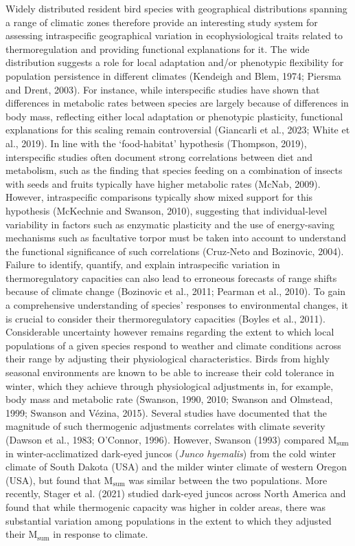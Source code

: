 \documentclass[10pt, twoside]{book} %
\begin{document}
Widely distributed resident bird species with geographical distributions spanning a range of climatic zones therefore provide an interesting study system for assessing intraspecific geographical variation in ecophysiological traits related to thermoregulation and providing functional explanations for it. The wide distribution suggests a role for local adaptation and/or phenotypic flexibility for population persistence in different climates (Kendeigh and Blem, 1974; Piersma and Drent, 2003). For instance, while interspecific studies have shown that differences in metabolic rates between species are largely because of differences in body mass, reflecting either local adaptation or phenotypic plasticity, functional explanations for this scaling remain controversial (Giancarli et al., 2023; White et al., 2019). In line with the ‘food-habitat’ hypothesis (Thompson, 2019), interspecific studies often document strong correlations between diet and metabolism, such as the finding that species feeding on a combination of insects with seeds and fruits typically have higher metabolic rates (McNab, 2009). However, intraspecific comparisons typically show mixed support for this hypothesis (McKechnie and Swanson, 2010), suggesting that individual-level variability in factors such as enzymatic plasticity and the use of energy-saving mechanisms such as facultative torpor must be taken into account to understand the functional significance of such correlations (Cruz‐Neto and Bozinovic, 2004).\\

Failure to identify, quantify, and explain intraspecific variation in thermoregulatory capacities can also lead to erroneous forecasts of range shifts because of climate change (Bozinovic et al., 2011; Pearman et al., 2010). To gain a comprehensive understanding of species' responses to environmental changes, it is crucial to consider their thermoregulatory capacities (Boyles et al., 2011). Considerable uncertainty however remains regarding the extent to which local populations of a given species respond to weather and climate conditions across their range by adjusting their physiological characteristics. Birds from highly seasonal environments are known to be able to increase their cold tolerance in winter, which they achieve through physiological adjustments in, for example, body mass and metabolic rate (Swanson, 1990, 2010; Swanson and Olmstead, 1999; Swanson and Vézina, 2015). Several studies have documented that the magnitude of such thermogenic adjustments correlates with climate severity (Dawson et al., 1983; O’Connor, 1996). However, Swanson (1993) compared M$_{\text{sum}}$ in winter-acclimatized dark-eyed juncos (\textit{Junco hyemalis}) from the cold winter climate of South Dakota (USA) and the milder winter climate of western Oregon (USA), but found that M$_{\text{sum}}$ was similar between the two populations. More recently, Stager et al. (2021) studied dark-eyed juncos across North America and found that while thermogenic capacity was higher in colder areas, there was substantial variation among populations in the extent to which they adjusted their M$_{\text{sum}}$ in response to climate. \\
\end{document}
